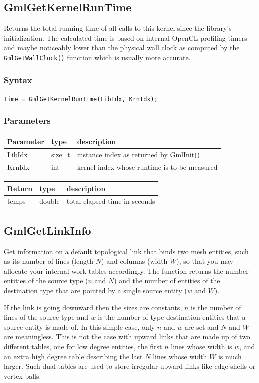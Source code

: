 \documentclass[a4paper,12pt]{article}
\begin{document}
\subsection{GmlGetKernelRunTime}
Returns the total running time of all calls to this kernel since the library's initialization. The calculated time is based on internal OpenCL profiling timers and maybe noticeably lower than the physical wall clock as computed by the {\tt GmlGetWallClock()} function which is usually more accurate.

\subsubsection*{Syntax}
{\tt time = GmlGetKernelRunTime(LibIdx, KrnIdx);}

\subsubsection*{Parameters}
\begin{tabular}{|m{2cm}|m{1.5cm}|m{10.5cm}|}
\hline
Parameter  & type    & description \\
\hline
LibIdx     & size\_t & instance index as returned by GmlInit() \\
\hline
KrnIdx     & int     & kernel index whose runtime is to be measured \\
\hline
\end{tabular}

\medskip

\begin{tabular}{|m{2cm}|m{1.5cm}|m{10.5cm}|}
\hline
Return     & type    & description \\
\hline
temps      & double  & total elapsed time in seconds \\
\hline
\end{tabular}


\subsection{GmlGetLinkInfo}
Get information on a default topological link that binds two mesh entities, such as its number of lines (length $N$) and columns (width $W$), so that you may allocate your internal work tables accordingly. The function returns the number entities of the source type ($n$ and $N$) and the number of entities of the destination type that are pointed by a single source entity ($w$ and $W$).

If the link is going downward then the sizes are constants, $n$ is the number of lines of the source type and $w$ is the number of type destination entities that a source entity is made of. In this simple case, only $n$ and $w$ are set and $N$ and $W$ are meaningless. This is not the case with upward links that are made up of two different tables, one for low degree entities, the first $n$ lines whose width is $w$, and an extra high degree table describing the last $N$ lines whose width $W$ is much larger. Such dual tables are used to store irregular upward links like edge shells or vertex balls.
\end{document}
